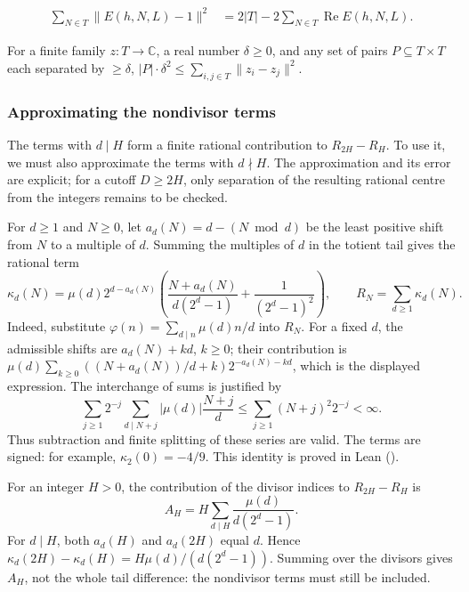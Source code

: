 \begin{prop}\label{prop:squared-distance-phase-one}
\[
\begin{aligned}
\sum_{N\in T}\|{E}(h,N,L)-1\|^2
  &= 2|T|-2\sum_{N\in T}\operatorname{Re}E(h,N,L).
\end{aligned}
\]
\end{prop}

\begin{lem}\label{lem:squared-distance-bound-separated-pairs}
For a finite family $z:T\to\mathbb{C}$, a real number $\delta\ge0$, and any set of pairs $P\subseteq
T\times T$ each separated by $\ge\delta$, $|P|\cdot\delta^2 \le
\sum_{i,j\in T}\|z_i-z_j\|^2$.
\end{lem}

\subsubsection{Approximating the nondivisor terms}\label{sec:nondivisor-enclosure}

The terms with $d\mid H$ form a finite rational contribution to
$R_{2H}-R_H$. To use it, we must also approximate the terms with
$d\nmid H$. The approximation and its error are explicit; for a cutoff
$D\ge2H$, only separation of the resulting rational centre from the
integers remains to be checked.

For $d\ge1$ and $N\ge0$, let $a_d(N)=d-(N\bmod d)$ be the least
positive shift from $N$ to a multiple of $d$. Summing the multiples of
$d$ in the totient tail gives the rational term
\[
 \kappa_d(N)=\mu(d)2^{d-a_d(N)}
 \left(\frac{N+a_d(N)}{d(2^d-1)}+\frac1{(2^d-1)^2}\right),
 \qquad R_N=\sum_{d\ge1}\kappa_d(N).
\]
Indeed, substitute $\varphi(n)=\sum_{d\mid n}\mu(d)n/d$ into $R_N$.
For a fixed $d$, the admissible shifts are $a_d(N)+kd$, $k\ge0$;
their contribution is
$\mu(d)\sum_{k\ge0}((N+a_d(N))/d+k)2^{-a_d(N)-kd}$,
which is the displayed expression. The interchange of sums is justified by
\[
 \sum_{j\ge1}2^{-j}\sum_{d\mid N+j}|\mu(d)|\frac{N+j}{d}
 \le \sum_{j\ge1}(N+j)^2 2^{-j}<\infty.
\]
Thus subtraction and finite splitting of these series are valid.
The terms are signed: for example, $\kappa_2(0)=-4/9$.
This identity is proved in Lean
().

\begin{prop}\label{prop:finite-divisor-sum}
For an integer $H>0$, the contribution of the divisor indices to
$R_{2H}-R_H$ is
\[
 A_H=H\sum_{d\mid H}\frac{\mu(d)}{d(2^d-1)}.
\]
For $d\mid H$, both $a_d(H)$ and $a_d(2H)$ equal $d$. Hence
$\kappa_d(2H)-\kappa_d(H)=H\mu(d)/(d(2^d-1))$.
Summing over the divisors gives $A_H$, not the whole tail difference:
the nondivisor terms must still be included.
\end{prop}

